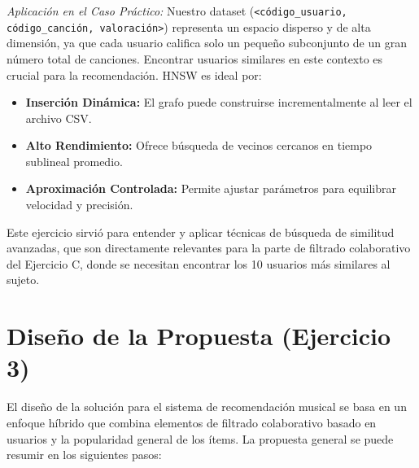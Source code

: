 \documentclass{article}
\begin{document}
\vspace{0.5em}
\noindent \textit{Aplicación en el Caso Práctico:} Nuestro dataset (\texttt{<código\_usuario, código\_canción, valoración>}) representa un espacio disperso y de alta dimensión, ya que cada usuario califica solo un pequeño subconjunto de un gran número total de canciones. Encontrar usuarios similares en este contexto es crucial para la recomendación. HNSW es ideal por:
\begin{itemize}[label=\textbullet]
    \item \textbf{Inserción Dinámica:} El grafo puede construirse incrementalmente al leer el archivo CSV.
    \item \textbf{Alto Rendimiento:} Ofrece búsqueda de vecinos cercanos en tiempo sublineal promedio.
    \item \textbf{Aproximación Controlada:} Permite ajustar parámetros para equilibrar velocidad y precisión.
\end{itemize}
Este ejercicio sirvió para entender y aplicar técnicas de búsqueda de similitud avanzadas, que son directamente relevantes para la parte de filtrado colaborativo del Ejercicio C, donde se necesitan encontrar los 10 usuarios más similares al sujeto.

\section{Diseño de la Propuesta (Ejercicio 3)}

El diseño de la solución para el sistema de recomendación musical se basa en un enfoque híbrido que combina elementos de filtrado colaborativo basado en usuarios y la popularidad general de los ítems. La propuesta general se puede resumir en los siguientes pasos:
\end{document}
